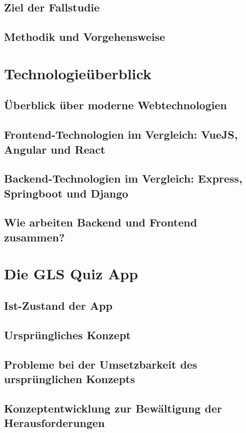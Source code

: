 \documentclass[biblatex]{lni}
\begin{document}
\subsection{Ziel der Fallstudie}

\subsection{Methodik und Vorgehensweise}

\section{Technologieüberblick}
\subsection{Überblick über moderne Webtechnologien}
\subsection{Frontend-Technologien im Vergleich: VueJS, Angular und React}
\subsection{Backend-Technologien im Vergleich: Express, Springboot und Django}
\subsection{Wie arbeiten Backend und Frontend zusammen?}

\section{Die GLS Quiz App}
\subsection{Ist-Zustand der App}
\subsection{Ursprüngliches Konzept}
\subsection{Probleme bei der Umsetzbarkeit des ursprünglichen Konzepts}
\subsection{Konzeptentwicklung zur Bewältigung der Herausforderungen}
\end{document}
